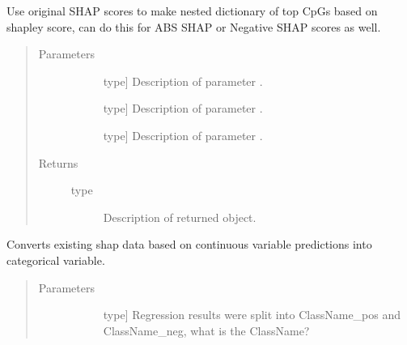 \documentclass[letterpaper,10pt,english]{sphinxmanual}
\begin{document}
\begin{fulllineitems}
\begin{fulllineitems}
\label{\detokenize{index:methylnet.interpretation_classes.ShapleyDataExplorer.regenerate_individual_shap_values}}
Use original SHAP scores to make nested dictionary of top CpGs based on shapley score, can do this for ABS SHAP or Negative SHAP scores as well.
\begin{quote}\begin{description}
\item[{Parameters}] \leavevmode\begin{description}
\item[{}] \leavevmode{[}type{]}
Description of parameter .

\item[{}] \leavevmode{[}type{]}
Description of parameter .

\item[{}] \leavevmode{[}type{]}
Description of parameter .

\end{description}

\item[{Returns}] \leavevmode\begin{description}
\item[{type}] \leavevmode
Description of returned object.

\end{description}

\end{description}\end{quote}

\end{fulllineitems}


\begin{fulllineitems}
\label{\detokenize{index:methylnet.interpretation_classes.ShapleyDataExplorer.return_binned_shapley_data}}
Converts existing shap data based on continuous variable predictions into categorical variable.
\begin{quote}\begin{description}
\item[{Parameters}] \leavevmode\begin{description}
\item[{}] \leavevmode{[}type{]}
Regression results were split into ClassName\_pos and ClassName\_neg, what is the ClassName?


\end{description}
\end{description}
\end{quote}
\end{fulllineitems}
\end{fulllineitems}
\end{document}
